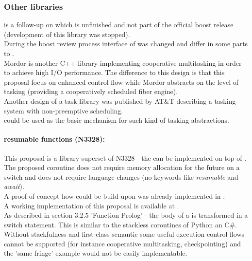 \subsubsection*{Other libraries}
\boostcoroutine is a follow-up on \boostcorosum which is unfinished and
not part of the official boost release (development of this library was
stopped).\\
During the boost review process interface of \boostcoroutine was changed and
differ in some parts to \boostcorosum.\\
Mordor\cite{mordor} is another C++ library implementing cooperative multitasking
in order to achieve high I/O performance. The difference to this design is that
this proposal focus on enhanced control flow while Mordor\cite{mordor} abstracts
on the level of tasking (providing a cooperatively scheduled fiber engine).\\
Another design of a task library was published by AT\&T\cite{atnt1989} describing
a tasking system with non-preemptive scheduling.\\
\coro could be used as the basic mechanism for such kind of tasking abstractions.\\

\paragraph*{resumable functions (N3328\cite{n3328}):}
This proposal is a library superset of N3328 - the \resumfn can be implemented
on top of \coro. The proposed coroutine does not require memory allocation for
the future on a switch and does not require language changes (no keywords like
\textit{resumable} and \textit{await}).\\
A proof-of-concept how \await could be build upon \boostroroutine was already
implemented in \awaite.\\
\newline
A working implementation of this proposal is available at \boostcoroutine.\\
As described in section 3.2.5 'Function Prolog' - the body of a \resumfn is
transformed in a switch statement. This is similar to the stackless coroutines
of Python an C\#.\\
\newline
Without stackfulness and first-class semantic some useful execution control
flows cannot be supported (for instance cooperative multitasking,
checkpointing) and the 'same fringe' example would not be easily implementable.
